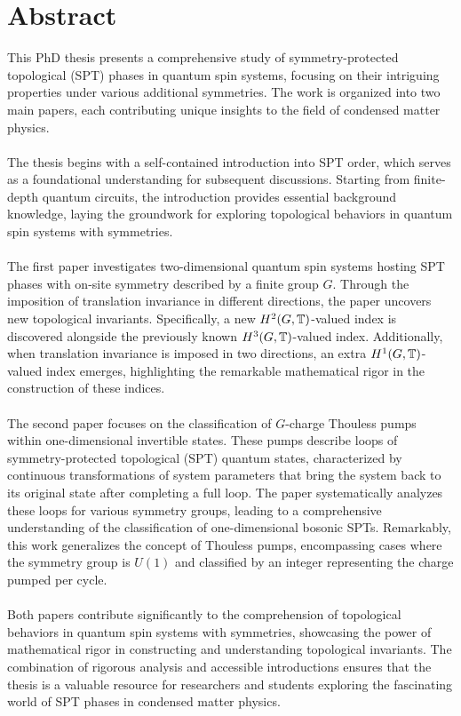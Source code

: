 \chapter{Abstract}                                 \label{ch:abstract}

This PhD thesis presents a comprehensive study of symmetry-protected topological (SPT) phases in quantum spin systems, focusing on their intriguing properties under various additional symmetries. The work is organized into two main papers, each contributing unique insights to the field of condensed matter physics.
\\\\
The thesis begins with a self-contained introduction into SPT order, which serves as a foundational understanding for subsequent discussions. Starting from finite-depth quantum circuits, the introduction provides essential background knowledge, laying the groundwork for exploring topological behaviors in quantum spin systems with symmetries.
\\\\
The first paper investigates two-dimensional quantum spin systems hosting SPT phases with on-site symmetry described by a finite group $G$. Through the imposition of translation invariance in different directions, the paper uncovers new topological invariants. Specifically, a new $H^2(G,\mathbb T)$-valued index is discovered alongside the previously known $H^3(G,\mathbb T)$-valued index. Additionally, when translation invariance is imposed in two directions, an extra $H^1(G,\mathbb T)$-valued index emerges, highlighting the remarkable mathematical rigor in the construction of these indices.
\\\\
The second paper focuses on the classification of $G$-charge Thouless pumps within one-dimensional invertible states. These pumps describe loops of symmetry-protected topological (SPT) quantum states, characterized by continuous transformations of system parameters that bring the system back to its original state after completing a full loop. The paper systematically analyzes these loops for various symmetry groups, leading to a comprehensive understanding of the classification of one-dimensional bosonic SPTs. Remarkably, this work generalizes the concept of Thouless pumps, encompassing cases where the symmetry group is $U(1)$ and classified by an integer representing the charge pumped per cycle.
\\\\
Both papers contribute significantly to the comprehension of topological behaviors in quantum spin systems with symmetries, showcasing the power of mathematical rigor in constructing and understanding topological invariants. The combination of rigorous analysis and accessible introductions ensures that the thesis is a valuable resource for researchers and students exploring the fascinating world of SPT phases in condensed matter physics.




\cleardoublepage

